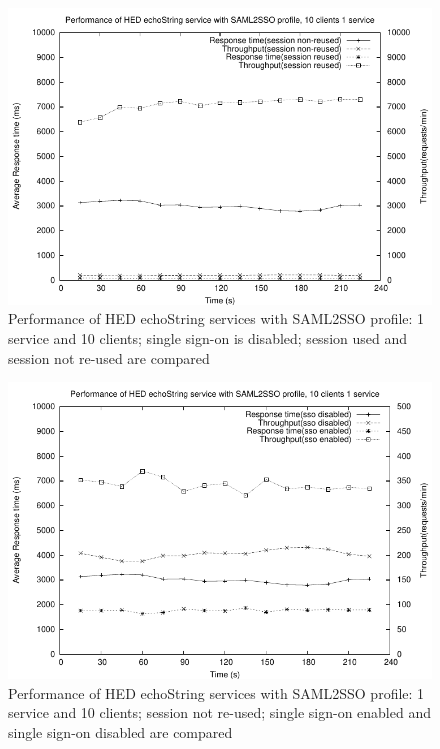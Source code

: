 \documentclass[conference]{IEEEtran}
\begin{document}
\begin{figure}
\includegraphics[width=0.9\columnwidth]{SAML2SSO_thread10_nosso.pdf}
\caption{Performance of HED echoString services with SAML2SSO profile: 1 service
and 10 clients; single sign-on is disabled; session used and session not re-used are compared}
\label{fig:SAML2SSO_thread10_nosso}
\end{figure}

\begin{figure}
\includegraphics[width=0.9\columnwidth]{SAML2SSO_thread10_nosso_and_sso.pdf}
\caption{Performance of HED echoString services with SAML2SSO profile: 1 service
and 10 clients; session not re-used; single sign-on enabled and single sign-on disabled are compared}
\label{fig:SAML2SSO_thread10_nosso_and_sso}
\end{figure}
\end{document}
